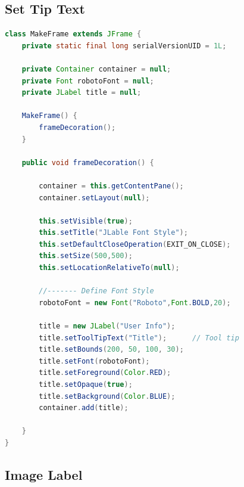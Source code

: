 \newpage
\subsection{Set Tip Text}

\begin{lstlisting}[language=java]
class MakeFrame extends JFrame {
	private static final long serialVersionUID = 1L;
	
	private Container container = null;
	private Font robotoFont = null;
	private JLabel title = null;
	
	MakeFrame() {
		frameDecoration();
	}
	
	public void frameDecoration() {

		container = this.getContentPane();
		container.setLayout(null);
		
		this.setVisible(true);
		this.setTitle("JLable Font Style");
		this.setDefaultCloseOperation(EXIT_ON_CLOSE);
		this.setSize(500,500);
		this.setLocationRelativeTo(null);
		
		//------- Define Font Style
		robotoFont = new Font("Roboto",Font.BOLD,20);
		
		title = new JLabel("User Info");
		title.setToolTipText("Title");		// Tool tip
		title.setBounds(200, 50, 100, 30);
		title.setFont(robotoFont);
		title.setForeground(Color.RED);
		title.setOpaque(true);
		title.setBackground(Color.BLUE);
		container.add(title);
		
	}
}

\end{lstlisting}


\newpage
\subsection{Image Label}

